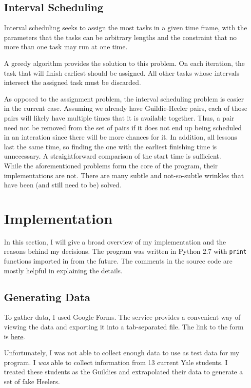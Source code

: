 \documentclass[letterpaper]{article}
\begin{document}
\subsection{Interval Scheduling}
Interval scheduling seeks to assign the most tasks in a given time frame, with the parameters that the tasks can be
arbitrary lengths and the constraint that no more than one task may run at one time.

A greedy algorithm provides the solution to this problem. On each iteration, the task that will finish earliest should
be assigned. All other tasks whose intervals intersect the assigned task must be discarded. 

As opposed to the assignment problem, the interval scheduling problem is easier in the current case. Assuming we already
have Guildie-Heeler pairs, each of those pairs will likely have multiple times that it is available together. Thus, a pair
need not be removed from the set of pairs if it does not end up being scheduled in an interation since there will be
more chances for it. In addition, all lessons last the same time, so finding the one with the earliest finishing time is
unnecessary. A straightforward comparison of the start time is sufficient.\\

While the aforementioned problems form the core of the program, their implementations are not. There are many subtle and
not-so-subtle wrinkles that have been (and still need to be) solved.

\section{Implementation}
In this section, I will give a broad overview of my implementation and the reasons behind my decisions. The program was
written in Python 2.7 with \texttt{print} functions imported in from the future. The comments in the source code are
mostly helpful in explaining the details.

\subsection{Generating Data}
To gather data, I used Google Forms. The service provides a convenient way of viewing the data and exporting it into a
tab-separated file. The link to the form is
\href{https://docs.google.com/a/yale.edu/forms/d/1dGMb0QIPz002zcYsh-v1KmuDlbSm6i8hd1kqZ29O0LI/viewform?c=0&w=1}{here}.

Unfortunately, I was not able to collect enough data to use as test data for my program. I \textit{was} able to collect
information from 13 current Yale students. I treated these students as the Guildies and extrapolated their data to
generate a set of fake Heelers.
\end{document}
